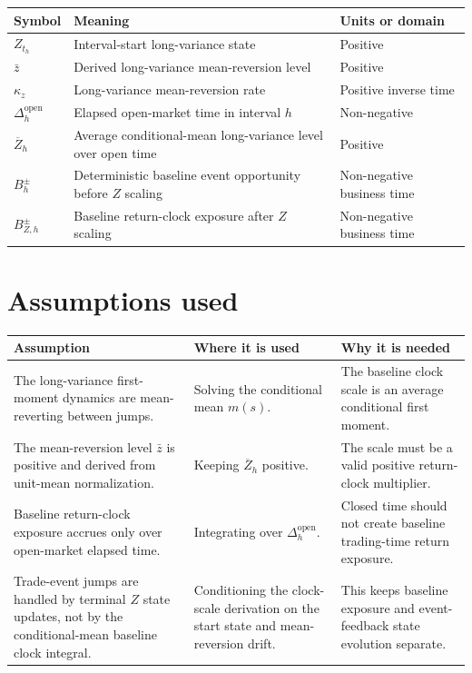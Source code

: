 \documentclass[11pt]{article}
\begin{document}
\begin{tabularx}{\textwidth}{lXX}
\toprule
Symbol & Meaning & Units or domain\\
\midrule
\(Z_{t_h}\) & Interval-start long-variance state & Positive\\
\(\bar z\) & Derived long-variance mean-reversion level & Positive\\
\(\kappa_z\) & Long-variance mean-reversion rate & Positive inverse time\\
\(\Delta_h^{\mathrm{open}}\) & Elapsed open-market time in interval \(h\) & Non-negative\\
\(\overline Z_h\) & Average conditional-mean long-variance level over open time & Positive\\
\(B_h^\pm\) & Deterministic baseline event opportunity before \(Z\) scaling & Non-negative business time\\
\(B_{Z,h}^\pm\) & Baseline return-clock exposure after \(Z\) scaling & Non-negative business time\\
\bottomrule
\end{tabularx}

\section{Assumptions used}

\begin{tabularx}{\textwidth}{XXX}
\toprule
Assumption & Where it is used & Why it is needed\\
\midrule
The long-variance first-moment dynamics are mean-reverting between jumps.
& Solving the conditional mean \(m(s)\).
& The baseline clock scale is an average conditional first moment.\\
The mean-reversion level \(\bar z\) is positive and derived from unit-mean normalization.
& Keeping \(\overline Z_h\) positive.
& The scale must be a valid positive return-clock multiplier.\\
Baseline return-clock exposure accrues only over open-market elapsed time.
& Integrating over \(\Delta_h^{\mathrm{open}}\).
& Closed time should not create baseline trading-time return exposure.\\
Trade-event jumps are handled by terminal \(Z\) state updates, not by the conditional-mean baseline clock integral.
& Conditioning the clock-scale derivation on the start state and mean-reversion drift.
& This keeps baseline exposure and event-feedback state evolution separate.\\
\bottomrule
\end{tabularx}
\end{document}
